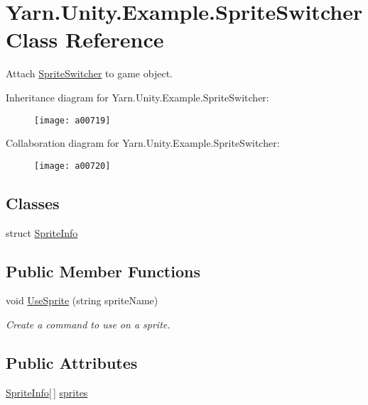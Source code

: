 \hypertarget{a00146}{\section{Yarn.\-Unity.\-Example.\-Sprite\-Switcher Class Reference}
\label{a00146}
}


Attach \hyperlink{a00146}{Sprite\-Switcher} to game object.  




Inheritance diagram for Yarn.\-Unity.\-Example.\-Sprite\-Switcher\-:
\nopagebreak
\begin{figure}[H]
\begin{center}
\leavevmode
\texttt{[image: a00719]}
\end{center}
\end{figure}


Collaboration diagram for Yarn.\-Unity.\-Example.\-Sprite\-Switcher\-:
\nopagebreak
\begin{figure}[H]
\begin{center}
\leavevmode
\texttt{[image: a00720]}
\end{center}
\end{figure}
\subsection*{Classes}
\begin{DoxyCompactItemize}
\item 
struct \hyperlink{a00146_a00354}{Sprite\-Info}
\end{DoxyCompactItemize}
\subsection*{Public Member Functions}
\begin{DoxyCompactItemize}
\item 
void \hyperlink{a00146_ac26718b713f342f3de8f3e569c5b62da}{Use\-Sprite} (string sprite\-Name)
\begin{DoxyCompactList}\small\item\em Create a command to use on a sprite. \end{DoxyCompactList}\end{DoxyCompactItemize}
\subsection*{Public Attributes}
\begin{DoxyCompactItemize}
\item 
\hyperlink{a00146_a00354}{Sprite\-Info}\mbox{[}$\,$\mbox{]} \hyperlink{a00146_a1e85d9f4f6b33ca7ae638cce2eb704aa}{sprites}
\end{DoxyCompactItemize}


